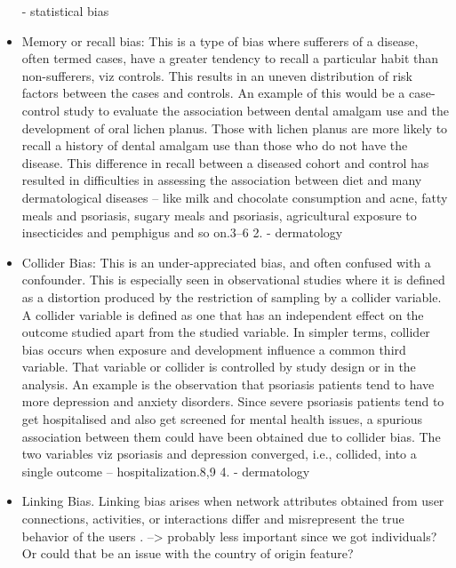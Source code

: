 \documentclass[12pt, a4paper, oneside]{book}   	%
\newif\ifrawcitationactive
\newcommand{\rawcitationend}{\color{black}\rawcitationactivefalse}
\begin{document}
\begin{itemize}
				\autocites{Mester_2022}{Mester_2017} - statistical bias
				\item Memory or recall bias: This is a type of bias where sufferers of a disease, often termed cases, have a greater tendency to recall a particular habit than non-sufferers, viz controls. This results in an uneven distribution of risk factors between the cases and controls. An example of this would be a case-control study to evaluate the association between dental amalgam use and the development of oral lichen planus. Those with lichen planus are more likely to recall a history of dental amalgam use than those who do not have the disease. This difference in recall between a diseased cohort and control has resulted in difficulties in assessing the association between diet and many dermatological diseases – like milk and chocolate consumption and acne, fatty meals and psoriasis, sugary meals and psoriasis, agricultural exposure to insecticides and pemphigus and so on.3–6 2. \autocite{Chakraborty_2023} - dermatology
				\item Collider Bias: This is an under-appreciated bias, and often confused with a confounder. This is especially seen in observational studies where it is defined as a distortion produced by the restriction of sampling by a collider variable. A collider variable is defined as one that has an independent effect on the outcome studied apart from the studied variable. In simpler terms, collider bias occurs when exposure and development influence a common third variable. That variable or collider is controlled by study design or in the analysis. An example is the observation that psoriasis patients tend to have more depression and anxiety disorders. Since severe psoriasis patients tend to get hospitalised and also get screened for mental health issues, a spurious association between them could have been obtained due to collider bias. The two variables viz psoriasis and depression converged, i.e., collided, into a single outcome – hospitalization.8,9 4. \autocite{Chakraborty_2023} - dermatology
				
				\item Linking Bias. Linking bias arises when network attributes obtained from user connections, activities, or interactions differ and misrepresent the true behavior of the users \autocite{M120_Olteanu_2019} \autocite{Mehrabi_2021}. --> probably less important since we got individuals? Or could that be an issue with the country of origin feature?
			\end{itemize}
			\rawcitationend
			
\end{document}
